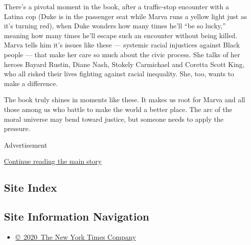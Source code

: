 There's a pivotal moment in the book, after a traffic-stop encounter
with a Latina cop (Duke is in the passenger seat while Marva runs a
yellow light just as it's turning red), when Duke wonders how many times
he'll ``be so lucky,'' meaning how many times he'll escape such an
encounter without being killed. Marva tells him it's issues like these
--- systemic racial injustices against Black people --- that make her
care so much about the civic process. She talks of her heroes Bayard
Rustin, Diane Nash, Stokely Carmichael and Coretta Scott King, who all
risked their lives fighting against racial inequality. She, too, wants
to make a difference.

The book truly shines in moments like these. It makes us root for Marva
and all those among us who battle to make the world a better place. The
arc of the moral universe may bend toward justice, but someone needs to
apply the pressure.

Advertisement

\protect\hyperlink{after-bottom}{Continue reading the main story}

\hypertarget{site-index}{%
\subsection{Site Index}\label{site-index}}

\hypertarget{site-information-navigation}{%
\subsection{Site Information
Navigation}\label{site-information-navigation}}

\begin{itemize}
\tightlist
\item
  \href{https://help.nytimes.com/hc/en-us/articles/115014792127-Copyright-notice}{©~2020~The
  New York Times Company}
\end{itemize}

